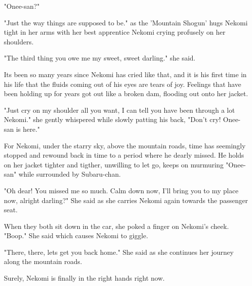 "Onee-san?"

"Just the way things are supposed to be." as the 'Mountain Shogun' hugs Nekomi tight in her arms with her best apprentice Nekomi crying profusely on her shoulders.

"The third thing you owe me my sweet, sweet darling." she said.

Its been so many years since Nekomi has cried like that, and it is his first time in his life that the fluids coming out of his eyes are tears of joy.
Feelings that have been holding up for years got out like a broken dam, flooding out onto her jacket.

"Just cry on my shoulder all you want, I can tell you have been through a lot Nekomi." she gently whispered while slowly patting his back, "Don't cry! Onee-san is here."

For Nekomi, under the starry sky, above the mountain roads, time has seemingly stopped and rewound back in time to a period where he dearly missed. He holds on her jacket tighter and tigther, unwilling to let go, keeps on murmuring "Onee-san" while surrounded by Subaru-chan.

"Oh dear! You missed me so much. Calm down now, I'll bring you to my place now, alright darling?" She said as she carries Nekomi again towards the passenger seat.

When they both sit down in the car, she poked a finger on Nekomi's cheek. "Boop." She said which causes Nekomi to giggle.

"There, there, lets get you back home." She said as she continues her journey along the mountain roads.

Surely, Nekomi is finally in the right hands right now.
